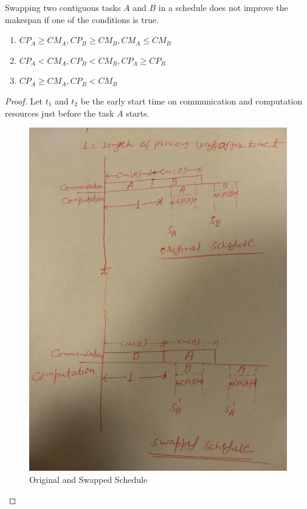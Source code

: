 \documentclass[runningheads]{llncs} %
\begin{document}
	\begin{lemma}\label{lemma:swappingOfTasks}
	Swapping two contiguous tasks $A$ and $B$ in a schedule does not improve the makespan if one of the conditions is true.
	\begin{enumerate}[label=\roman*)]
		\item  $CP_A \ge CM_A, CP_B \ge CM_B, CM_A \le CM_B$
		\item $CP_A < CM_A, CP_B < CM_B, CP_A \ge CP_B$
		\item $CP_A \ge CM_A, CP_B < CM_B$
	\end{enumerate}
\end{lemma}
\begin{proof}
	Let $t_1$ and $t_2$ be the early start time on communication and computation resources just before the task $A$ starts.
	
	\begin{figure}[htb]
		\centering
		\includegraphics[width=\textwidth, height=0.5\textheight, 
		keepaspectratio]{Figs/swappedSchedule.jpg}
		\caption{ \label{fig:bothSchedule} Original and Swapped Schedule}
	\end{figure}
	

\end{proof}
\end{document}
